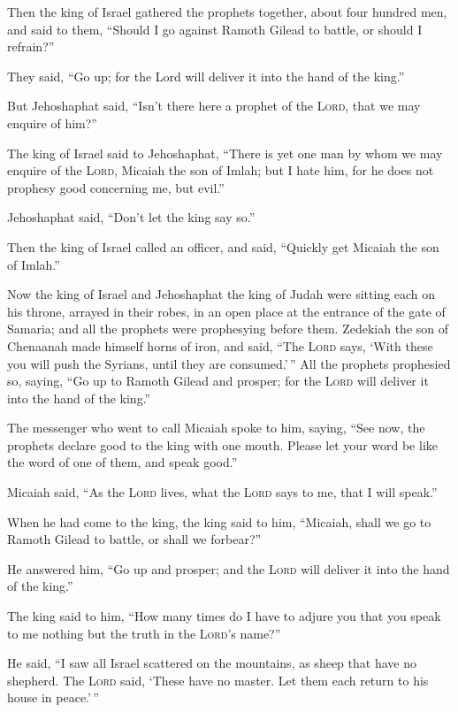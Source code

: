  Then the king of Israel gathered the prophets together,
about four hundred men, and said to them, ``Should I go against Ramoth
Gilead to battle, or should I refrain?''

They said, ``Go up; for the Lord will deliver it into the hand of the
king.''

 But Jehoshaphat said, ``Isn't there here a prophet of the
\textsc{Lord}, that we may enquire of him?''

 The king of Israel said to Jehoshaphat, ``There is yet
one man by whom we may enquire of the \textsc{Lord}, Micaiah the son of
Imlah; but I hate him, for he does not prophesy good concerning me, but
evil.''

Jehoshaphat said, ``Don't let the king say so.''

 Then the king of Israel called an officer, and said,
``Quickly get Micaiah the son of Imlah.''

 Now the king of Israel and Jehoshaphat the king of Judah
were sitting each on his throne, arrayed in their robes, in an open
place at the entrance of the gate of Samaria; and all the prophets were
prophesying before them.  Zedekiah the son of Chenaanah
made himself horns of iron, and said, ``The \textsc{Lord} says, `With
these you will push the Syrians, until they are consumed.'\,''
 All the prophets prophesied so, saying, ``Go up to
Ramoth Gilead and prosper; for the \textsc{Lord} will deliver it into
the hand of the king.''

 The messenger who went to call Micaiah spoke to him,
saying, ``See now, the prophets declare good to the king with one mouth.
Please let your word be like the word of one of them, and speak good.''

 Micaiah said, ``As the \textsc{Lord} lives, what the
\textsc{Lord} says to me, that I will speak.''

 When he had come to the king, the king said to him,
``Micaiah, shall we go to Ramoth Gilead to battle, or shall we
forbear?''

He answered him, ``Go up and prosper; and the \textsc{Lord} will deliver
it into the hand of the king.''

 The king said to him, ``How many times do I have to
adjure you that you speak to me nothing but the truth in the
\textsc{Lord}'s name?''

 He said, ``I saw all Israel scattered on the mountains,
as sheep that have no shepherd. The \textsc{Lord} said, `These have no
master. Let them each return to his house in peace.'\,''

